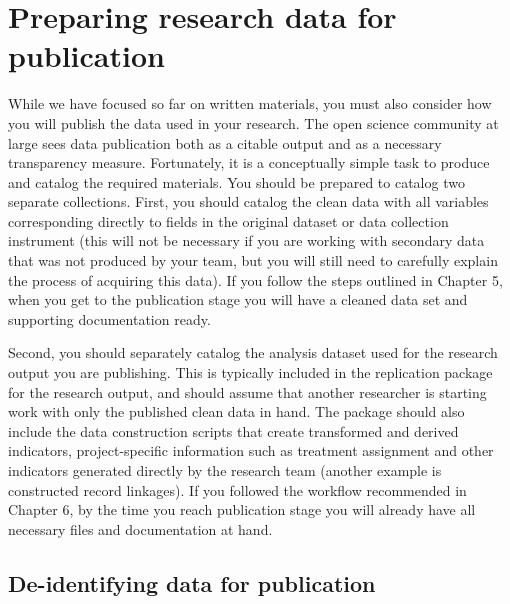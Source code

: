 
\section{Preparing research data for publication}

While we have focused so far on written materials,
you must also consider how you will publish
the data used in your research.
The open science community at large sees data publication
both as a citable output and as a necessary transparency measure.
Fortunately, it is a conceptually simple task to produce
and catalog the required materials.
You should be prepared to catalog two separate collections.
First, you should catalog the clean data
with all variables corresponding directly
to fields in the original dataset or data collection instrument
(this will not be necessary if you are working with secondary data
that was not produced by your team,
but you will still need to carefully explain the process of acquiring this data).
If you follow the steps outlined in Chapter 5,
when you get to the publication stage you will have
a cleaned data set and supporting documentation ready.

Second, you should separately catalog
the analysis dataset used for the research output you are publishing.
This is typically included in the replication package for the research output,
and should assume that another researcher is starting work
with only the published clean data in hand.
The package should also include the data construction scripts
that create transformed and derived indicators,
project-specific information
such as treatment assignment and other indicators
generated directly by the research team (another example is constructed record linkages).
If you followed the workflow recommended in Chapter 6,
by the time you reach publication stage you will already have all necessary
files and documentation at hand.

\subsection{De-identifying data for publication}

